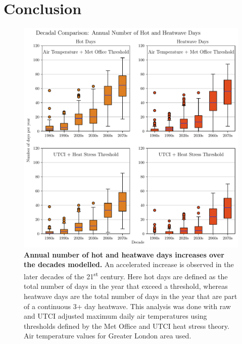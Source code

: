\documentclass[10pt,letterpaper]{article}
\begin{document}
\section*{Conclusion}




\pagebreak

\begin{figure}
\begin{adjustwidth}{-2.25in}{0in}
    \begin{center}
        \includegraphics[width=0.87\linewidth]{./boxplots_slides.pdf}
    \end{center}
    \caption{
    {\bf Annual number of hot and heatwave days increases over the decades modelled.}
    An accelerated increase is observed in the later decades of the 21\textsuperscript{st} century.
    Here hot days are defined as the total number of days in the year that exceed a threshold, whereas heatwave days are the total number of days in the year that are part of a continuous 3+ day heatwave. This analysis was done with raw and UTCI adjusted maximum daily air temperatures using thresholds defined by the Met Office and UTCI heat stress theory. Air temperature values for Greater London area used.
    }
    \label{boxplots}
\end{adjustwidth}
\end{figure}
\end{document}
